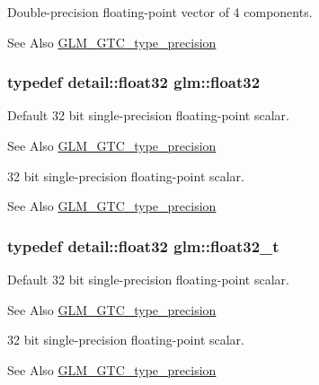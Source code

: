 Double-\/precision floating-\/point vector of 4 components. \begin{DoxySeeAlso}{See Also}
\hyperlink{group__gtc__type__precision}{G\-L\-M\-\_\-\-G\-T\-C\-\_\-type\-\_\-precision} 
\end{DoxySeeAlso}
\hypertarget{group__gtc__type__precision_ga814f2f65354b6588b067cc5c67a6b340}{
\subsubsection[{float32}]{\setlength{\rightskip}{0pt plus 5cm}typedef detail\-::float32 {\bf glm\-::float32}}}\label{group__gtc__type__precision_ga814f2f65354b6588b067cc5c67a6b340}
Default 32 bit single-\/precision floating-\/point scalar. \begin{DoxySeeAlso}{See Also}
\hyperlink{group__gtc__type__precision}{G\-L\-M\-\_\-\-G\-T\-C\-\_\-type\-\_\-precision}
\end{DoxySeeAlso}
32 bit single-\/precision floating-\/point scalar. \begin{DoxySeeAlso}{See Also}
\hyperlink{group__gtc__type__precision}{G\-L\-M\-\_\-\-G\-T\-C\-\_\-type\-\_\-precision} 
\end{DoxySeeAlso}
\hypertarget{group__gtc__type__precision_ga642737ae3e7c434b366f2191e6944bf2}{
\subsubsection[{float32\-\_\-t}]{\setlength{\rightskip}{0pt plus 5cm}typedef detail\-::float32 {\bf glm\-::float32\-\_\-t}}}\label{group__gtc__type__precision_ga642737ae3e7c434b366f2191e6944bf2}
Default 32 bit single-\/precision floating-\/point scalar. \begin{DoxySeeAlso}{See Also}
\hyperlink{group__gtc__type__precision}{G\-L\-M\-\_\-\-G\-T\-C\-\_\-type\-\_\-precision}
\end{DoxySeeAlso}
32 bit single-\/precision floating-\/point scalar. \begin{DoxySeeAlso}{See Also}
\hyperlink{group__gtc__type__precision}{G\-L\-M\-\_\-\-G\-T\-C\-\_\-type\-\_\-precision} 
\end{DoxySeeAlso}
